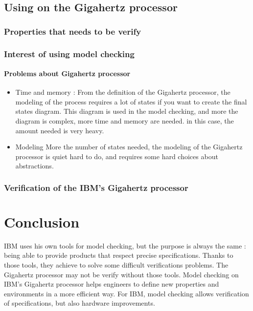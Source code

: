 \documentclass[a4paper,12pt]{article} %
\begin{document}
\subsection{Using on the Gigahertz processor}
\subsubsection{Properties that needs to be verify}
\subsubsection{Interest of using model checking}
\paragraph{Problems about Gigahertz processor }
\begin{itemize}
\item{Time and memory : } From the definition of the Gigahertz processor, the modeling of the process requires a lot of states if you want to create the final states diagram. This diagram is used in the model checking, and more the diagram is complex, more time and memory are needed. in this case, the amount needed is very heavy.
\item{Modeling} More the number of states needed, the modeling of the  Gigahertz processor is quiet hard to do, and requires some hard choices about abstractions.
\end{itemize}
\subsubsection{Verification of the IBM's Gigahertz processor}


\section*{Conclusion}
\paragraph{}IBM uses his own tools for model checking, but the purpose is always the same : being able to provide products that respect precise specifications. Thanks to those tools, they achieve to solve some difficult verifications problems. The Gigahertz processor may not be verify without those tools. Model checking on IBM's Gigahertz processor helps engineers to define new properties and environments in a more efficient way. For IBM, model checking allows verification of specifications, but also hardware improvements. 

\newpage


\end{document}
